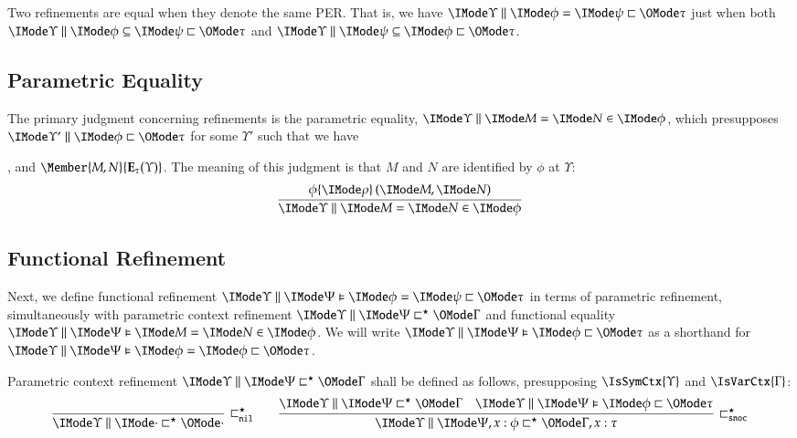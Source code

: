 \documentclass[11pt]{article}
\theoremstyle{definition}
\theoremstyle{remark}
\numberwithin{equation}{section}
\newcommand\Exprs{\mathbf{E}}
\begin{document}
Two refinements are equal when they denote the same PER. That is, we have
$\EqRefines{\Upsilon}{\phi}{\psi}{\tau}$ just when both
$\IsSubrefinement{\Upsilon}{\phi}{\psi}{\tau}$ and
$\IsSubrefinement{\Upsilon}{\psi}{\phi}{\tau}$.

\subsection{Parametric Equality}

The primary judgment concerning refinements is the parametric equality,
$\RMemEq{\Upsilon}{M}{N}{\phi}$, which presupposes
$\Refines{\Upsilon'}{\phi}{\tau}$ for some $\Upsilon'$ such that we have
,
and $\Member{M,N}{\Exprs_\tau(\Upsilon)}$. The meaning of this judgment is
that $M$ and $N$ are identified by $\phi$ at $\Upsilon$:
\[
  \infer{
    \RMemEq{\Upsilon}{M}{N}{\phi}
  }{
    \RefEquate{\phi}{\rho}{M}{N}
  }
\]

\subsection{Functional Refinement}

\newcommand\RefinesCtxNil{\sqsubset^\star_{\mathtt{nil}}}
\newcommand\RefinesCtxSnoc{\sqsubset^\star_{\mathtt{snoc}}}
\newcommand\PFunRefNil{\vDash^\sqsubset_{\mathtt{nil}}}
\newcommand\PFunRefSnoc{\vDash^\sqsubset_{\mathtt{snoc}}}

Next, we define functional refinement
$\FEqRefines{\Upsilon}{\Psi}{\phi}{\psi}{\tau}$ in terms of parametric refinement,
simultaneously with parametric context refinement
$\RefinesCtx{\Upsilon}{\Psi}{\Gamma}$ and functional equality
$\FRMemEq{\Upsilon}{\Psi}{M}{N}{\phi}$. We will write
$\FRefines{\Upsilon}{\Psi}{\phi}{\tau}$ as a shorthand for
$\FEqRefines{\Upsilon}{\Psi}{\phi}{\phi}{\tau}$.

\newcommand\DefRefinesCtxNil[1]{
  \infer[\RefinesCtxNil]{
    \RefinesCtx{#1}{\cdot}{\cdot}
  }{
  }
}
\newcommand\DefRefinesCtxSnoc[6]{
  \infer[\RefinesCtxSnoc]{
    \RefinesCtx{#1}{#2,#3:#4}{#5,#3:#6}
  }{
    \RefinesCtx{#1}{#2}{#5} &
    \FRefines{#1}{#2}{#4}{#6}
  }
}

Parametric context refinement $\RefinesCtx{\Upsilon}{\Psi}{\Gamma}$ shall be
defined as follows, presupposing $\IsSymCtx{\Upsilon}$ and
$\IsVarCtx{\Gamma}$:
\begin{gather*}
  \DefRefinesCtxNil{\Upsilon}\qquad
  \DefRefinesCtxSnoc{\Upsilon}{\Psi}{x}{\phi}{\Gamma}{\tau}
\end{gather*}
\end{document}

